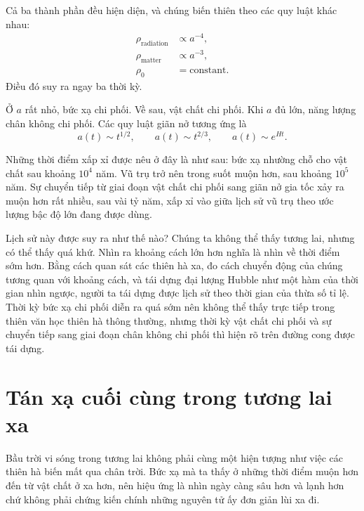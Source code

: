 Cả ba thành phần đều hiện diện, và chúng biến thiên theo các quy luật khác nhau:
\begin{equation}
\begin{aligned}
\rho_{\text{radiation}}&\propto a^{-4},\\
\rho_{\text{matter}}&\propto a^{-3},\\
\rho_0&=\text{constant}.
\end{aligned}
\end{equation}
Điều đó suy ra ngay ba thời kỳ.

Ở \(a\) rất nhỏ, bức xạ chi phối. Về sau, vật chất chi phối. Khi \(a\) đủ lớn, năng lượng chân không chi phối. Các quy luật giãn nở tương ứng là
\begin{equation}
a(t)\sim t^{1/2},
\qquad
a(t)\sim t^{2/3},
\qquad
a(t)\sim e^{Ht}.
\end{equation}

Những thời điểm xấp xỉ được nêu ở đây là như sau: bức xạ nhường chỗ cho vật chất sau khoảng \(10^4\) năm. Vũ trụ trở nên trong suốt muộn hơn, sau khoảng \(10^5\) năm. Sự chuyển tiếp từ giai đoạn vật chất chi phối sang giãn nở gia tốc xảy ra muộn hơn rất nhiều, sau vài tỷ năm, xấp xỉ vào giữa lịch sử vũ trụ theo ước lượng bậc độ lớn đang được dùng.

Lịch sử này được suy ra như thế nào? Chúng ta không thể thấy tương lai, nhưng có thể thấy quá khứ. Nhìn ra khoảng cách lớn hơn nghĩa là nhìn về thời điểm sớm hơn. Bằng cách quan sát các thiên hà xa, đo cách chuyển động của chúng tương quan với khoảng cách, và tái dựng đại lượng Hubble như một hàm của thời gian nhìn ngược, người ta tái dựng được lịch sử theo thời gian của thừa số tỉ lệ. Thời kỳ bức xạ chi phối diễn ra quá sớm nên không thể thấy trực tiếp trong thiên văn học thiên hà thông thường, nhưng thời kỳ vật chất chi phối và sự chuyển tiếp sang giai đoạn chân không chi phối thì hiện rõ trên đường cong được tái dựng.

\section{Tán xạ cuối cùng trong tương lai xa}

Bầu trời vi sóng trong tương lai không phải cùng một hiện tượng như việc các thiên hà biến mất qua chân trời. Bức xạ mà ta thấy ở những thời điểm muộn hơn đến từ vật chất ở xa hơn, nên hiệu ứng là nhìn ngày càng sâu hơn và lạnh hơn chứ không phải chứng kiến chính những nguyên tử ấy đơn giản lùi xa đi.

\begin{classroomqa}
\end{classroomqa}

